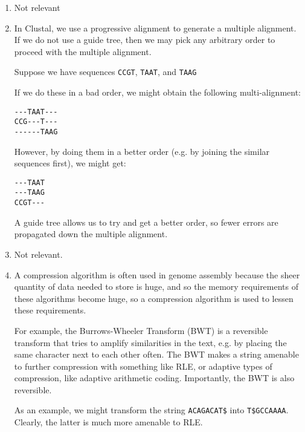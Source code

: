 


\begin{enumerate}[label=(\alph*)]
  \item Not relevant

  \item
    In Clustal, we use a progressive alignment to generate a multiple alignment. If we do not use a guide tree, then we may pick any arbitrary order to proceed with the multiple alignment.

    Suppose we have sequences \texttt{CCGT}, \texttt{TAAT}, and \texttt{TAAG}

    If we do these in a bad order, we might obtain the following multi-alignment:

\begin{verbatim}
---TAAT---
CCG---T---
------TAAG
\end{verbatim}

However, by doing them in a better order (e.g. by joining the similar sequences first), we might get:

\begin{verbatim}
---TAAT
---TAAG
CCGT---
\end{verbatim}

A guide tree allows us to try and get a better order, so fewer errors are propagated down the multiple alignment.

\item
  Not relevant.

\item
  A compression algorithm is often used in genome assembly because the sheer quantity of data needed to store is huge, and so the memory requirements of these algorithms become huge, so a compression algorithm is used to lessen these requirements.

  For example, the Burrows-Wheeler Transform (BWT) is a reversible transform that tries to amplify similarities in the text, e.g. by placing the same character next to each other often. The BWT makes a string amenable to further compression with something like RLE, or adaptive types of compression, like adaptive arithmetic coding. Importantly, the BWT is also reversible.

  As an example, we might transform the string \texttt{ACAGACAT\$} into \texttt{T\$GCCAAAA}. Clearly, the latter is much more amenable to RLE.

        
\end{enumerate}

